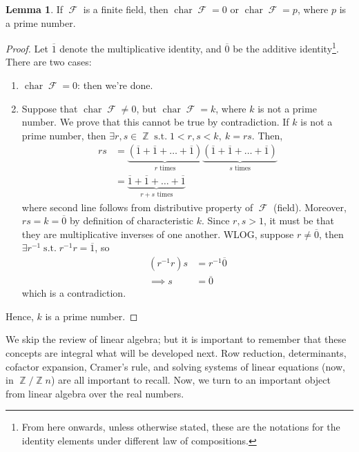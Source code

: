 \documentclass[11pt]{amsart} %
\theoremstyle{definition}
\newtheorem{lemma}[definition]{Lemma}
\theoremstyle{definition}
\DeclareMathOperator{\Z}{\mathbb{Z}}
\DeclareMathOperator{\FF}{\mathcal{F}}
\DeclareMathOperator{\charr}{char}
\DeclareMathOperator{\suchthat}{\text{ s.t. }}
\numberwithin{equation}{section}
\begin{document}
\begin{lemma}
	\label{charpor0}
	If $\FF$ is a finite field, then $\charr \FF = 0$ or $\charr \FF = p$, where $p$ is a prime number.
\end{lemma}

\begin{proof}
	Let $\overline{1}$ denote the multiplicative identity, and $\overline{0}$ be the additive identity\footnote{From here onwards, unless otherwise stated, these are the notations for the identity elements under different law of compositions.}. There are two cases:
	\begin{enumerate}%
		\item $\charr \FF = 0$: then we're done.
		\item Suppose that $\charr \FF \neq 0$, but $\charr \FF = k$, where $k$ is not a prime number. We prove that this cannot be true by contradiction. If $k$ is not a prime number, then $\exists r,s \in \Z \suchthat 1 < r,s < k, \: k= rs$. Then,
		$$ \begin{aligned}
		rs &= \underbrace{ (\overline{1} + \overline{1} + \dots + \overline{1}) }_{r \text{ times}} \underbrace{ (\overline{1} + \overline{1} + \dots + \overline{1}) }_{s \text{ times}}\\
		&= \underbrace{ \overline{1} + \overline{1} + \dots + \overline{1} }_{r+s \text{ times}}
		\end{aligned}$$
		where second line follows from distributive property of $\FF$ (field). Moreover, $rs = k = \overline{ 0}$ by definition of characteristic $k$. Since $r,s > 1$, it must be that they are multiplicative inverses of one another. WLOG, suppose $r \neq \overline{ 0}$, then $\exists r^{-1} \suchthat r^{-1} r = \overline{ 1}$, so
		$$\begin{aligned}
		(r^{-1} r ) s &= r^{-1} \overline{ 0} \\
		\implies s &= \overline{ 0}
		\end{aligned}$$
		which is a contradiction. 
	\end{enumerate}
Hence, $k$ is a prime number.
\end{proof}

We skip the review of linear algebra; but it is important to remember that these concepts are integral what will be developed next. Row reduction, determinants, cofactor expansion, Cramer's rule, and solving systems of linear equations (now, in $\Z / \Z n$) are all important to recall. Now, we turn to an important object from linear algebra over the real numbers.
\end{document}
